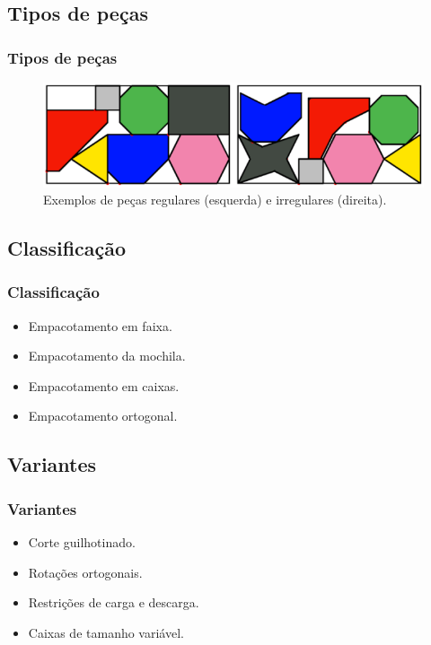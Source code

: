 \documentclass[12pt]{beamer}
\begin{document}
    \subsection{Tipos de peças}\label{subsec:tipos-de-pecas}
    \begin{frame}
        \frametitle{Tipos de peças}
        \begin{figure}[!htb]
            \centering
            \includegraphics[scale=0.6]{utils/images/pieces-example}
            \caption{Exemplos de peças regulares (esquerda) e irregulares (direita).}
            \label{fig:pieces}
        \end{figure}
    \end{frame}

    \subsection{Classificação}\label{subsec:classificacao}
    \begin{frame}
        \frametitle{Classificação}
        \begin{itemize}
            \item<1-> Empacotamento em faixa.
            \item<2-> Empacotamento da mochila.
            \item<3-> Empacotamento em caixas.
            \item<4-> Empacotamento ortogonal.
        \end{itemize}
    \end{frame}

    \subsection{Variantes}\label{subsec:variantes}
    \begin{frame}
        \frametitle{Variantes}
        \begin{itemize}
            \item Corte guilhotinado.
            \item Rotações ortogonais.
            \item Restrições de carga e descarga.
            \item Caixas de tamanho variável.
        \end{itemize}
    \end{frame}
\end{document}
